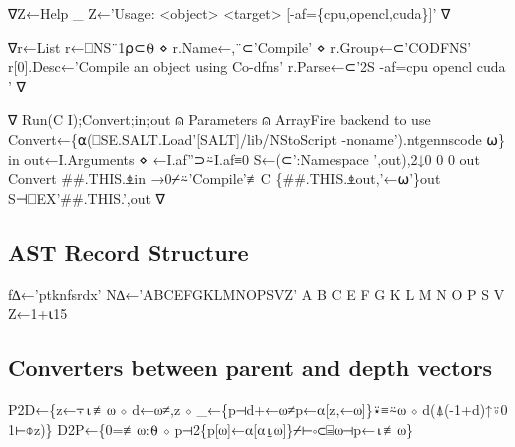 \documentclass{article}%
\begin{document}
\nwenddocs{}\endmoddef\nwstartdeflinemarkup{}\nwenddeflinemarkup
∇Z←Help _
 Z←'Usage: <object> <target> [-af=\{cpu,opencl,cuda\}]'
∇

∇r←List
 r←⎕NS¨1⍴⊂⍬ ⋄ r.Name←,¨⊂'Compile' ⋄ r.Group←⊂'CODFNS'
 r[0].Desc←'Compile an object using Co-dfns'
 r.Parse←⊂'2S -af=cpu opencl cuda '
∇

∇ Run(C I);Convert;in;out
⍝ Parameters
⍝              ArrayFire backend to use
 Convert←\{⍺(⎕SE.SALT.Load'[SALT]/lib/NStoScript -noname').ntgennscode ⍵\}
 in out←I.Arguments ⋄ ←I.af''⊃⍨I.af≡0
 S←(⊂':Namespace ',out),2↓0 0 0 out Convert ##.THIS.⍎in
 →0⌿⍨'Compile'≢C
 \{##.THIS.⍎out,'←⍵'\}out  S⊣⎕EX'##.THIS.',out
∇
\nwendcode{}\nwdocspar

\subsection{AST Record Structure}

\nwenddocs{}\endmoddef\nwstartdeflinemarkup{}\nwenddeflinemarkup
f∆←'ptknfsrdx'
N∆←'ABCEFGKLMNOPSVZ'
A B C E F G K L M N O P S V Z←1+⍳15
\nwendcode{}\nwdocspar

\subsection{Converters between parent and depth vectors}

\nwenddocs{}\endmoddef\nwstartdeflinemarkup{}\nwenddeflinemarkup
P2D←\{z←⍪⍳≢⍵ ⋄ d←⍵≠,z ⋄ _←\{p⊣d+←⍵≠p←⍺[z,←⍵]\}⍣≡⍨⍵ ⋄ d(⍋(-1+d)↑⍤0 1⊢⌽z)\}
D2P←\{0=≢⍵:⍬ ⋄ p⊣2\{p[⍵]←⍺[⍺⍸⍵]\}⌿⊢∘⊂⌸⍵⊣p←⍳≢⍵\}
\nwendcode{}\nwdocspar
\end{document}
